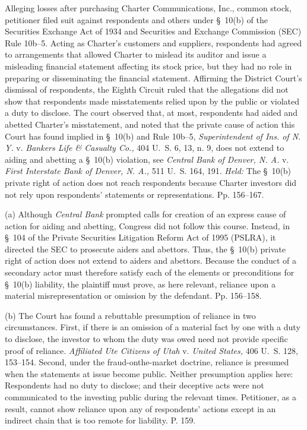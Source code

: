 
\setcounter{page}{148}

  Alleging losses after purchasing Charter Communications, Inc., common stock, petitioner filed suit against respondents and others under \S~10(b) of the Securities Exchange Act of 1934 and Securities and Exchange Commission (SEC) Rule 10b--5. Acting as Charter's customers and suppliers, respondents had agreed to arrangements that allowed Charter to mislead its auditor and issue a misleading financial statement affecting its stock price, but they had no role in preparing or disseminating the financial statement. Affirming the District Court's dismissal of respondents, the Eighth Circuit ruled that the allegations did not show that respondents made misstatements relied upon by the public or violated a duty to disclose. The court observed that, at most, respondents had aided and abetted Charter's misstatement, and noted that the private cause of action this Court has found implied in \S~10(b) and Rule 10b--5, \emph{Superintendent of Ins. of N. Y.} v. \emph{Bankers Life \& Casualty Co.,} 404 U.~S. 6, 13, n. 9, does not extend to aiding and abetting a \S~10(b) violation, see \emph{Central Bank of Denver, N. A.} v. \emph{First Interstate Bank of Denver, N. A.,} 511 U.~S. 164, 191. \emph{Held:} The \S~10(b) private right of action does not reach respondents because Charter investors did not rely upon respondents' statements or representations. Pp. 156--167.

  (a) Although \emph{Central Bank} prompted calls for creation of an express cause of action for aiding and abetting, Congress did not follow this course. Instead, in \S~104 of the Private Securities Litigation Reform Act of 1995 (PSLRA), it directed the SEC to prosecute aiders and abettors. Thus, the \S~10(b) private right of action does not extend to aiders and abettors. Because the conduct of a secondary actor must therefore satisfy each of the elements or preconditions for \S~10(b) liability, the plaintiff must prove, as here relevant, reliance upon a material misrepresentation or omission by the defendant. Pp. 156--158.

  (b) The Court has found a rebuttable presumption of reliance in two circumstances. First, if there is an omission of a material fact by one with a duty to disclose, the investor to whom the duty was owed need not provide specific proof of reliance. \emph{Affiliated Ute Citizens of Utah} v. \emph{United States,} 406 U.~S. 128, 153--154. Second, under the fraud-on\newpage the-market doctrine, reliance is presumed when the statements at issue become public. Neither presumption applies here: Respondents had no duty to disclose; and their deceptive acts were not communicated to the investing public during the relevant times. Petitioner, as a result, cannot show reliance upon any of respondents' actions except in an indirect chain that is too remote for liability. P. 159.

